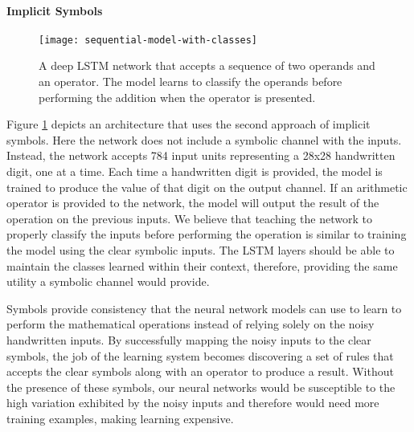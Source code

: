 \paragraph{Implicit Symbols}

\begin{figure}[t]
	\centering
	\texttt{[image: sequential-model-with-classes]}
	\caption{A deep LSTM network that accepts a sequence of two operands and an operator. The model learns to classify the operands before performing the addition when the operator is presented.}
	\label{fig:sequential-model-with-classes}
\end{figure}

Figure \ref{fig:sequential-model-with-classes} depicts an architecture that uses the second approach of implicit symbols. Here the network does not include a symbolic channel with the inputs. Instead, the network accepts 784 input units representing a 28x28 handwritten digit, one at a time. Each time a handwritten digit is provided, the model is trained to produce the value of that digit on the output channel. If an arithmetic operator is provided to the network, the model will output the result of the operation on the previous inputs. We believe that teaching the network to properly classify the inputs before performing the operation is similar to training the model using the clear symbolic inputs. The LSTM layers should be able to maintain the classes learned within their context, therefore, providing the same utility a symbolic channel would provide.

\bigskip

Symbols provide consistency that the neural network models can use to learn to perform the mathematical operations instead of relying solely on the noisy handwritten inputs. By successfully mapping the noisy inputs to the clear symbols, the job of the learning system becomes discovering a set of rules that accepts the clear symbols along with an operator to produce a result. Without the presence of these symbols, our neural networks would be susceptible to the high variation exhibited by the noisy inputs and therefore would need more training examples, making learning expensive.

